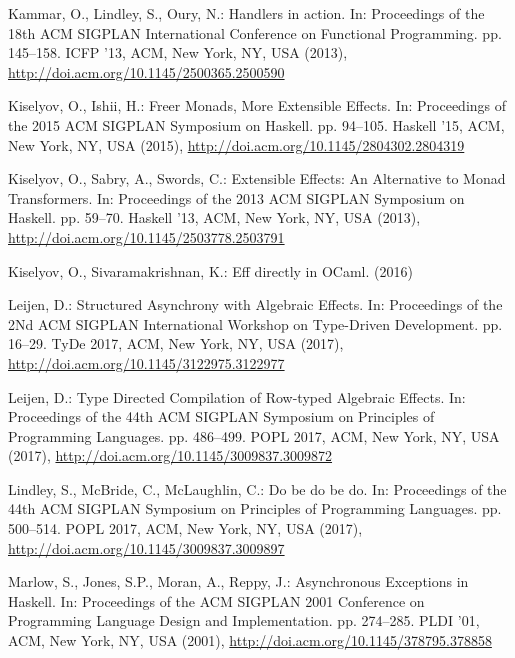 \documentclass{llncs}
\begin{document}
\begin{thebibliography}{36}
Kammar, O., Lindley, S., Oury, N.: Handlers in action.
\newblock In: Proceedings of the 18th ACM SIGPLAN International Conference on
  Functional Programming. pp. 145--158. ICFP '13, ACM, New York, NY, USA
  (2013), \urlprefix\url{http://doi.acm.org/10.1145/2500365.2500590}

Kiselyov, O., Ishii, H.: {Freer Monads, More Extensible Effects}.
\newblock In: Proceedings of the 2015 ACM SIGPLAN Symposium on Haskell. pp.
  94--105. Haskell '15, ACM, New York, NY, USA (2015),
  \urlprefix\url{http://doi.acm.org/10.1145/2804302.2804319}

Kiselyov, O., Sabry, A., Swords, C.: {Extensible Effects: An Alternative to
  Monad Transformers}.
\newblock In: Proceedings of the 2013 ACM SIGPLAN Symposium on Haskell. pp.
  59--70. Haskell '13, ACM, New York, NY, USA (2013),
  \urlprefix\url{http://doi.acm.org/10.1145/2503778.2503791}

Kiselyov, O., Sivaramakrishnan, K.: Eff directly in {OCaml}.
 (2016)

Leijen, D.: {Structured Asynchrony with Algebraic Effects}.
\newblock In: Proceedings of the 2Nd ACM SIGPLAN International Workshop on
  Type-Driven Development. pp. 16--29. TyDe 2017, ACM, New York, NY, USA
  (2017{}),
  \urlprefix\url{http://doi.acm.org/10.1145/3122975.3122977}

Leijen, D.: {Type Directed Compilation of Row-typed Algebraic Effects}.
\newblock In: Proceedings of the 44th ACM SIGPLAN Symposium on Principles of
  Programming Languages. pp. 486--499. POPL 2017, ACM, New York, NY, USA
  (2017{}),
  \urlprefix\url{http://doi.acm.org/10.1145/3009837.3009872}

Lindley, S., McBride, C., McLaughlin, C.: Do be do be do.
\newblock In: Proceedings of the 44th ACM SIGPLAN Symposium on Principles of
  Programming Languages. pp. 500--514. POPL 2017, ACM, New York, NY, USA
  (2017), \urlprefix\url{http://doi.acm.org/10.1145/3009837.3009897}

Marlow, S., Jones, S.P., Moran, A., Reppy, J.: {Asynchronous Exceptions in
  {Haskell}}.
\newblock In: Proceedings of the ACM SIGPLAN 2001 Conference on Programming
  Language Design and Implementation. pp. 274--285. PLDI '01, ACM, New York,
  NY, USA (2001), \urlprefix\url{http://doi.acm.org/10.1145/378795.378858}


\end{thebibliography}
\end{document}
